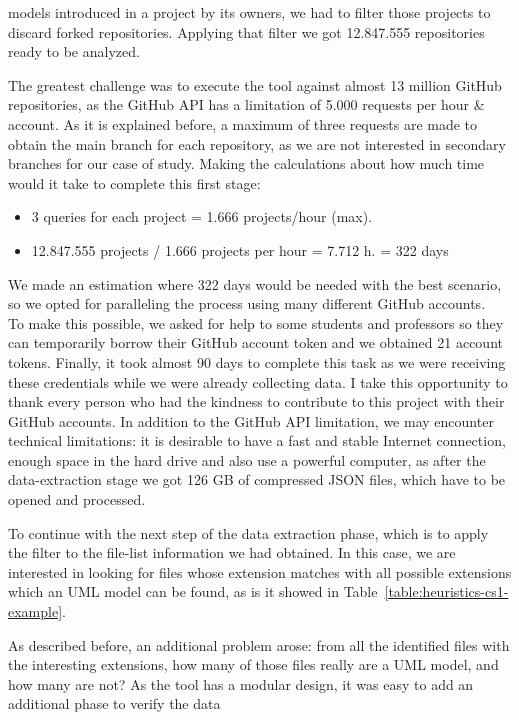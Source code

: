 \documentclass[a4paper, 12pt]{book}
\begin{document}
models introduced in a project by its owners, we had to filter those projects to discard forked repositories. Applying that
filter we got 12.847.555 repositories ready to be analyzed.\par
The greatest challenge was to execute the tool against almost 13 million GitHub repositories, as the GitHub API has a limitation
of 5.000 requests per hour \& account. As it is explained before, a maximum of three requests are made to obtain the main
branch for each repository, as we are not interested in secondary branches for our case of study. Making the calculations about
how much time would it take to complete this first stage:
\begin{itemize}
  \item 3 queries for each project = 1.666 projects/hour (max).
  \item 12.847.555 projects / 1.666 projects per hour = 7.712 h. = 322 days
\end{itemize}
We made an estimation where 322 days would be needed with the best scenario, so we opted for paralleling the process using many
different GitHub accounts.\\
To make this possible, we asked for help to some students and professors so they can temporarily borrow their GitHub account
token and we obtained 21 account tokens. Finally, it took almost 90 days to complete this task as we were receiving these credentials
while we were already collecting data. I take this opportunity to thank every person who had the kindness to contribute to this project
with their GitHub accounts.
In addition to the GitHub API limitation, we may encounter technical limitations: it is desirable to have a fast and stable Internet
connection, enough space in the hard drive and also use a powerful computer, as after the data-extraction stage we got 126 GB of compressed
JSON files, which have to be opened and processed.\par
To continue with the next step of the data extraction phase, which is to apply the filter to the file-list information
we had obtained. In this case, we are interested in looking for files whose extension matches with all possible extensions which an
UML model can be found, as is it showed in Table~\ref{table:heuristics-cs1-example}.\par
As described before, an additional problem arose: from all the identified files with the interesting extensions, how many of those files
really are a UML model, and how many are not? As the tool has a modular design, it was easy to add an additional phase to verify the data
\end{document}
